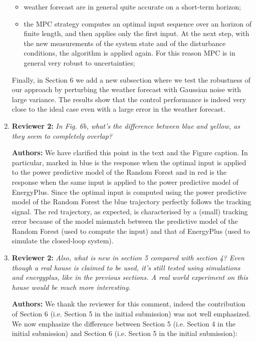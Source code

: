 \documentclass{article}
\begin{document}
\begin{enumerate}
	\begin{itemize}

	\item weather forecast are in general quite accurate on a short-term horizon;

	\item the MPC strategy computes an optimal input sequence over an horizon of finite length, and then applies only the first input. At the next step, with the new measurements of the system state and of the disturbance conditions, the algorithm is applied again. For this reason MPC is in general very robust to uncertainties;

	\end{itemize}
	Finally, in Section 6 we add a new subsection where we test the robustness of our approach by perturbing the weather forecast with Gaussian noise with large variance. The results show that the control performance is indeed very close to the ideal case even with a large error in the weather forecast.



\item \textbf{Reviewer 2:} \textit{In Fig. 6b, what's the difference between blue and yellow, as they seem to completely overlap?}



\textbf{Authors:} We have clarified this point in the text and the Figure caption. In particular, marked in blue is the response when the optimal input is applied to the power predictive model of the Random Forest and in red is the response when the same input is applied to the power predictive model of EnergyPlus. Since the optimal input is computed using the power predictive model of the Random Forest the blue trajectory perfectly follows the tracking signal. The red trajectory, as expected, is characterised by a (small) tracking error because of the model mismatch between the predictive model of the Random Forest (used to compute the input) and that of EnergyPlus (used to simulate the closed-loop system).



\item \textbf{Reviewer 2:} \textit{Also, what is new in section 5 compared with section 4? Even though a real house is claimed to be used, it's still tested using simulations and energyplus, like in the previous sections. A real world experiment on this house would be much more interesting.}



\textbf{Authors:} We thank the reviewer for this comment, indeed the contribution of Section 6 (i.e. Section 5 in the initial submission) was not well emphasized. We now emphasize the difference between Section 5 (i.e. Section 4 in the initial submission) and Section 6 (i.e. Section 5 in the initial submission):
\begin{itemize}


\end{itemize}
\end{enumerate}
\end{document}
